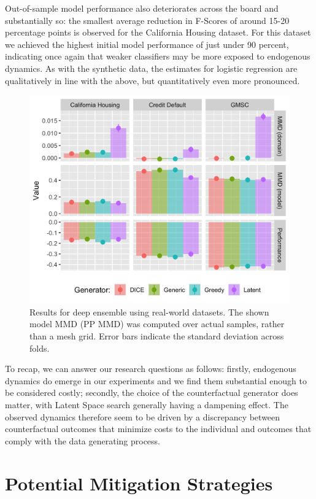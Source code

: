 \documentclass[conference,final,]{IEEEtran}
\theoremstyle{definition}
\theoremstyle{definition}
\theoremstyle{definition}
\theoremstyle{definition}
\theoremstyle{remark}
\begin{document}
Out-of-sample model performance also deteriorates across the board and substantially so: the smallest average reduction in F-Scores of around 15-20 percentage points is observed for the California Housing dataset. For this dataset we achieved the highest initial model performance of just under 90 percent, indicating once again that weaker classifiers may be more exposed to endogenous dynamics. As with the synthetic data, the estimates for logistic regression are qualitatively in line with the above, but quantitatively even more pronounced.

\begin{figure}

{\centering \includegraphics[width=0.9\linewidth]{www/real_world_results} 

}

\caption{Results for deep ensemble using real-world datasets. The shown model MMD (PP MMD) was computed over actual samples, rather than a mesh grid. Error bars indicate the standard deviation across folds.}\label{fig:real}
\end{figure}

To recap, we can answer our research questions as follows: firstly, endogenous dynamics do emerge in our experiments and we find them substantial enough to be considered costly; secondly, the choice of the counterfactual generator does matter, with Latent Space search generally having a dampening effect. The observed dynamics therefore seem to be driven by a discrepancy between counterfactual outcomes that minimize costs to the individual and outcomes that comply with the data generating process.

\hypertarget{mitigate}{%
\section{Potential Mitigation Strategies}\label{mitigate}}
\end{document}
